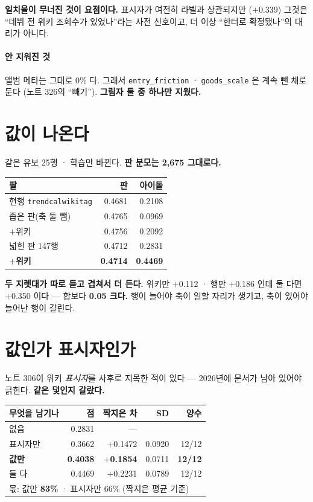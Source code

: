 \documentclass[10pt]{article}
\begin{document}
\textbf{일치율이 무너진 것이 요점이다.} 표시자가 여전히 라벨과 상관되지만
($+$0.339) 그것은 ``데뷔 전 위키 조회수가 있었나''라는 사전 신호이고,
더 이상 ``한터로 확정됐나''의 대리가 아니다.

\paragraph{안 지워진 것} 앨범 메타는 그대로 0\% 다. 그래서
\texttt{entry\_friction} · \texttt{goods\_scale} 은 계속 뺀 채로 둔다
(노트 326의 ``빼기''). \textbf{그림자 둘 중 하나만 지웠다.}

\section{값이 나온다}

같은 유보 25행 · 학습만 바뀐다. \textbf{판 분모는 2,675 그대로다.}

\begin{center}\footnotesize
\begin{tabular}{lrr}
\hline
팔 & 판 & 아이돌 \\
\hline
현행 \texttt{trendcalwikitag} & 0.4681 & 0.2108 \\
좁은 판(축 둘 뺌) & 0.4765 & 0.0969 \\
\quad $+$위키 & 0.4756 & 0.2092 \\
넓힌 판 147행 & 0.4712 & 0.2831 \\
\quad \textbf{$+$위키} & \textbf{0.4714} & \textbf{0.4469} \\
\hline
\end{tabular}
\end{center}

\textbf{두 지렛대가 따로 듣고 겹쳐서 더 든다.} 위키만 $+$0.112 · 행만
$+$0.186 인데 둘 다면 $+$0.350 이다 --- 합보다 \textbf{0.05 크다.}
행이 늘어야 축이 일할 자리가 생기고, 축이 있어야 늘어난 행이 갈린다.

\section{값인가 표시자인가}

노트 306이 위키 \emph{표시자}를 사후로 지목한 적이 있다 --- 2026년에
문서가 남아 있어야 긁힌다. \textbf{같은 덫인지 갈랐다.}

\begin{center}\footnotesize
\begin{tabular}{lrrrr}
\hline
무엇을 남기나 & 점 & 짝지은 차 & SD & 양수 \\
\hline
없음 & 0.2831 & --- & & \\
표시자만 & 0.3662 & $+$0.1472 & 0.0920 & 12/12 \\
\textbf{값만} & \textbf{0.4038} & \textbf{$+$0.1854} & 0.0711 & \textbf{12/12} \\
둘 다 & 0.4469 & $+$0.2231 & 0.0789 & 12/12 \\
\hline
\multicolumn{5}{l}{몫: 값만 \textbf{83\%} · 표시자만 66\% (짝지은 평균 기준)} \\
\hline
\end{tabular}
\end{center}
\end{document}
